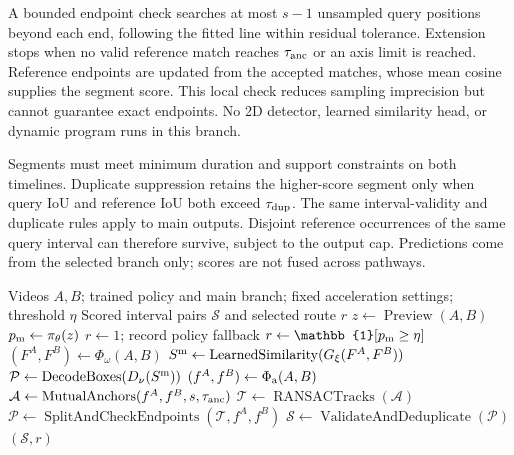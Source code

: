 A bounded endpoint check searches at most $s-1$ unsampled query positions beyond each end,
following the fitted line within residual tolerance. Extension stops when no valid reference
match reaches $\tau_{\rm anc}$ or an axis limit is reached. Reference endpoints are updated
from the accepted matches, whose mean cosine supplies the segment score. This local check
reduces sampling imprecision but cannot guarantee exact endpoints. No 2D detector, learned
similarity head, or dynamic program runs in this branch.

Segments must meet minimum duration and support constraints on both timelines. Duplicate
suppression retains the higher-score segment only when query IoU and reference IoU both
exceed $\tau_{\rm dup}$. The same interval-validity and duplicate rules apply to main outputs.
Disjoint reference occurrences of the same query interval can therefore survive, subject to
the output cap. Predictions come from the selected branch only; scores are not fused across
pathways.

\begin{algorithm}[t]
\caption{FastVCL inference for one video pair}
\label{alg:inference}
\begin{algorithmic}[1]
\Require Videos $A,B$; trained policy and main branch; fixed acceleration settings; threshold $\eta$
\Ensure Scored interval pairs $\mathcal S$ and selected route $r$
\State $z\gets\operatorname{Preview}(A,B)$
\State $p_{\rm m}\gets\pi_\theta(z)$
    \State $r\gets1$; record policy fallback
\Else
    \State $r\gets\mathbb{1}[p_{\rm m}\ge\eta]$
\EndIf
{}
    \State $(F^A,F^B)\gets\Phi_\omega(A,B)$
    \State $S^{\rm m}\gets\operatorname{LearnedSimilarity}(G_\xi(F^A,F^B))$
    \State $\mathcal P\gets\operatorname{DecodeBoxes}(D_\nu(S^{\rm m}))$
\Else
    \State $(f^A,f^B)\gets\Phi_{\rm a}(A,B)$
    \State $\mathcal A\gets\operatorname{MutualAnchors}(f^A,f^B,s,\tau_{\rm anc})$
    \State $\mathcal T\gets\operatorname{RANSACTracks}(\mathcal A)$
    \State $\mathcal P\gets\operatorname{SplitAndCheckEndpoints}(\mathcal T,f^A,f^B)$
\EndIf
\State $\mathcal S\gets\operatorname{ValidateAndDeduplicate}(\mathcal P)$
\State \Return $(\mathcal S,r)$
\end{algorithmic}
\end{algorithm}

